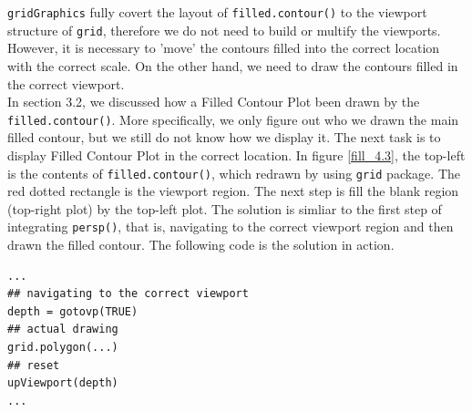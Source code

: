 \documentclass[paper=a4, fontsize=11pt]{report}
\begin{document}
\texttt{gridGraphics} fully covert the layout of \texttt{filled.contour()} to the viewport structure of \texttt{grid}, therefore we do not need to build or multify the viewports. However, it is necessary to 'move' the contours filled into the correct location with the correct scale. On the other hand, we need to draw the contours filled in the correct viewport.\\

In section 3.2, we discussed how a Filled Contour Plot been drawn by the \texttt{filled.contour()}. More specifically, we only figure out who we drawn the main filled contour, but we still do not know how we display it. The next task is to display Filled Contour Plot in the correct location. In figure \ref{fill_4.3}, the top-left is the contents of \texttt{filled.contour()}, which redrawn by using \texttt{grid} package. The red dotted rectangle is the viewport region. The next step is fill the blank region (top-right plot) by the top-left plot. The solution is simliar to the first step of integrating \texttt{persp()}, that is, navigating to the correct viewport region and then drawn the filled contour. The following code is the solution in action.

\begin{lstlisting}
...
## navigating to the correct viewport
depth = gotovp(TRUE)
## actual drawing
grid.polygon(...)
## reset
upViewport(depth)
...
\end{lstlisting}
\end{document}
